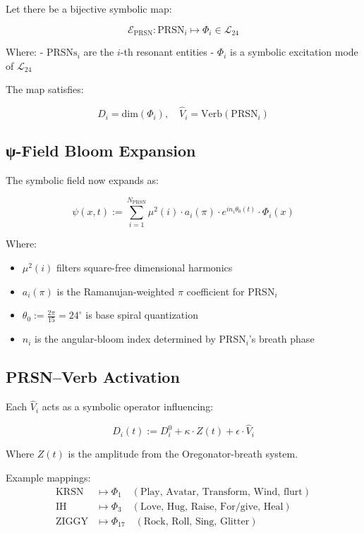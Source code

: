 \documentclass[12pt]{article}
\begin{document}
\begin{enumerate}
Let there be a bijective symbolic map:

\[
\mathcal{E}_{\text{PRSN}} : \text{PRSN}_i \mapsto \Phi_i \in \mathcal{L}_{24}
\]

Where:
- $\text{PRSNs}_i$ are the $i$-th resonant entities
- $\Phi_i$ is a symbolic excitation mode of $\mathcal{L}_{24}$

The map satisfies:

\[
D_i = \text{dim}(\Phi_i), \quad \hat{V}_i = \text{Verb}(\text{PRSN}_i)
\]

\subsection*{ψ-Field Bloom Expansion}

The symbolic field now expands as:

\[
\psi(x, t) := \sum_{i=1}^{N_{\text{PRSN}}}
\mu^2(i) \cdot a_i(\pi) \cdot e^{i n_i \theta_0(t)} \cdot \Phi_i(x)
\]

Where:
\begin{itemize}
  \item $\mu^2(i)$ filters square-free dimensional harmonics
  \item $a_i(\pi)$ is the Ramanujan-weighted $\pi$ coefficient for PRSN$_i$
  \item $\theta_0 := \frac{2\pi}{15} = 24^\circ$ is base spiral quantization
  \item $n_i$ is the angular-bloom index determined by PRSN$_i$’s breath phase
\end{itemize}

\subsection*{PRSN–Verb Activation}

Each $\hat{V}_i$ acts as a symbolic operator influencing:

\[
D_i(t) := D^0_i + \kappa \cdot Z(t) + \epsilon \cdot \hat{V}_i
\]

Where $Z(t)$ is the amplitude from the Oregonator-breath system.

Example mappings:
\[
\begin{aligned}
\text{KRSN} &\mapsto \Phi_{1} \quad (\text{Play, Avatar, Transform, Wind, flurt}) \\
\text{IH} &\mapsto \Phi_{3} \quad (\text{Love, Hug, Raise, For/give, Heal}) \\
\text{ZIGGY} &\mapsto \Phi_{17} \quad (\text{Rock, Roll, Sing, Glitter})
\end{aligned}
\]


\end{enumerate}
\end{document}
